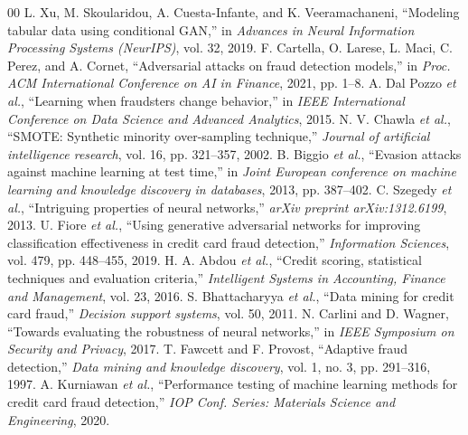\documentclass[conference]{IEEEtran}
\begin{document}
\begin{thebibliography}{00}
 L. Xu, M. Skoularidou, A. Cuesta-Infante, and K. Veeramachaneni, ``Modeling tabular data using conditional GAN,'' in \emph{Advances in Neural Information Processing Systems (NeurIPS)}, vol. 32, 2019.
 F. Cartella, O. Larese, L. Maci, C. Perez, and A. Cornet, ``Adversarial attacks on fraud detection models,'' in \emph{Proc. ACM International Conference on AI in Finance}, 2021, pp. 1--8.
 A. Dal Pozzo \emph{et al.}, ``Learning when fraudsters change behavior,'' in \emph{IEEE International Conference on Data Science and Advanced Analytics}, 2015.
 N. V. Chawla \emph{et al.}, ``SMOTE: Synthetic minority over-sampling technique,'' \emph{Journal of artificial intelligence research}, vol. 16, pp. 321--357, 2002.
 B. Biggio \emph{et al.}, ``Evasion attacks against machine learning at test time,'' in \emph{Joint European conference on machine learning and knowledge discovery in databases}, 2013, pp. 387--402.
 C. Szegedy \emph{et al.}, ``Intriguing properties of neural networks,'' \emph{arXiv preprint arXiv:1312.6199}, 2013.
 U. Fiore \emph{et al.}, ``Using generative adversarial networks for improving classification effectiveness in credit card fraud detection,'' \emph{Information Sciences}, vol. 479, pp. 448--455, 2019.
 H. A. Abdou \emph{et al.}, ``Credit scoring, statistical techniques and evaluation criteria,'' \emph{Intelligent Systems in Accounting, Finance and Management}, vol. 23, 2016.
 S. Bhattacharyya \emph{et al.}, ``Data mining for credit card fraud,'' \emph{Decision support systems}, vol. 50, 2011.
 N. Carlini and D. Wagner, ``Towards evaluating the robustness of neural networks,'' in \emph{IEEE Symposium on Security and Privacy}, 2017.
 T. Fawcett and F. Provost, ``Adaptive fraud detection,'' \emph{Data mining and knowledge discovery}, vol. 1, no. 3, pp. 291--316, 1997.
 A. Kurniawan \emph{et al.}, ``Performance testing of machine learning methods for credit card fraud detection,'' \emph{IOP Conf. Series: Materials Science and Engineering}, 2020.
\end{thebibliography}
\end{document}
